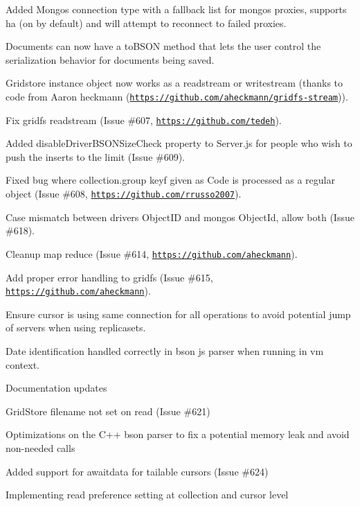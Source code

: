 \begin{DoxyItemize}
\item Added Mongos connection type with a fallback list for mongos proxies, supports ha (on by default) and will attempt to reconnect to failed proxies.
\item Documents can now have a to\+B\+S\+ON method that lets the user control the serialization behavior for documents being saved.
\item Gridstore instance object now works as a readstream or writestream (thanks to code from Aaron heckmann (\href{https://github.com/aheckmann/gridfs-stream}{\tt https\+://github.\+com/aheckmann/gridfs-\/stream})).
\item Fix gridfs readstream (Issue \#607, \href{https://github.com/tedeh}{\tt https\+://github.\+com/tedeh}).
\item Added disable\+Driver\+B\+S\+O\+N\+Size\+Check property to Server.\+js for people who wish to push the inserts to the limit (Issue \#609).
\item Fixed bug where collection.\+group keyf given as Code is processed as a regular object (Issue \#608, \href{https://github.com/rrusso2007}{\tt https\+://github.\+com/rrusso2007}).
\item Case mismatch between driver\textquotesingle{}s Object\+ID and mongo\textquotesingle{}s Object\+Id, allow both (Issue \#618).
\item Cleanup map reduce (Issue \#614, \href{https://github.com/aheckmann}{\tt https\+://github.\+com/aheckmann}).
\item Add proper error handling to gridfs (Issue \#615, \href{https://github.com/aheckmann}{\tt https\+://github.\+com/aheckmann}).
\item Ensure cursor is using same connection for all operations to avoid potential jump of servers when using replicasets.
\item Date identification handled correctly in bson js parser when running in vm context.
\item Documentation updates
\item Grid\+Store filename not set on read (Issue \#621)
\item Optimizations on the C++ bson parser to fix a potential memory leak and avoid non-\/needed calls
\item Added support for awaitdata for tailable cursors (Issue \#624)
\item Implementing read preference setting at collection and cursor level
\begin{DoxyItemize}

\end{DoxyItemize}
\end{DoxyItemize}
